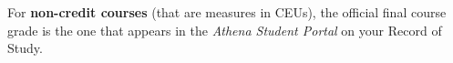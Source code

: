 For {\bf non-credit courses} (that are measures in CEUs), the official
final course grade is the one that appears in the {\em Athena Student
  Portal} on your Record of Study.
